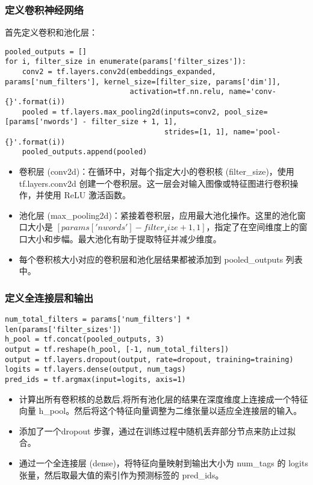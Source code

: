 \subsubsection{定义卷积神经网络}

首先定义卷积和池化层：

\begin{lstlisting}
pooled_outputs = []
for i, filter_size in enumerate(params['filter_sizes']):
    conv2 = tf.layers.conv2d(embeddings_expanded, params['num_filters'], kernel_size=[filter_size, params['dim']],
                             activation=tf.nn.relu, name='conv-{}'.format(i))
    pooled = tf.layers.max_pooling2d(inputs=conv2, pool_size=[params['nwords'] - filter_size + 1, 1],
                                     strides=[1, 1], name='pool-{}'.format(i))
    pooled_outputs.append(pooled)\end{lstlisting}

\begin{itemize}
    \item 卷积层 (conv2d)：在循环中，对每个指定大小的卷积核 (filter\_size)，使用 tf.layers.conv2d 创建一个卷积层。这一层会对输入图像或特征图进行卷积操作，并使用 ReLU 激活函数。
    \item 池化层 (max\_pooling2d)：紧接着卷积层，应用最大池化操作。这里的池化窗口大小是 $[params['nwords'] - filter_size + 1, 1]$，指定了在空间维度上的窗口大小和步幅。最大池化有助于提取特征并减少维度。
    \item     每个卷积核大小对应的卷积层和池化层结果都被添加到 pooled\_outputs 列表中。
\end{itemize}

\subsubsection{定义全连接层和输出}

\begin{lstlisting}
num_total_filters = params['num_filters'] * len(params['filter_sizes'])
h_pool = tf.concat(pooled_outputs, 3)
output = tf.reshape(h_pool, [-1, num_total_filters])
output = tf.layers.dropout(output, rate=dropout, training=training)
logits = tf.layers.dense(output, num_tags)
pred_ids = tf.argmax(input=logits, axis=1)\end{lstlisting}

\begin{itemize}
    \item 计算出所有卷积核的总数后,将所有池化层的结果在深度维度上连接成一个特征向量 h\_pool。然后将这个特征向量调整为二维张量以适应全连接层的输入。
    \item 添加了一个dropout 步骤，通过在训练过程中随机丢弃部分节点来防止过拟合。
    \item 通过一个全连接层 (dense)，将特征向量映射到输出大小为 num\_tags 的 logits 张量，然后取最大值的索引作为预测标签的 pred\_ids。
\end{itemize}

